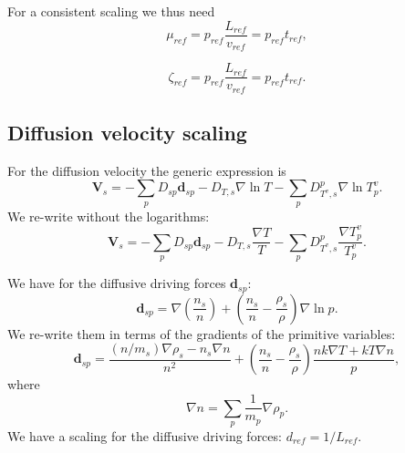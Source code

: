 \documentclass[a4paper,11pt,english]{article}
\begin{document}
For a consistent scaling we thus need
\begin{equation}
     \mu_{ref} = p_{ref} \frac{L_{ref}}{v_{ref}} = p_{ref} t_{ref},
\end{equation}

\begin{equation}
     \zeta_{ref} = p_{ref} \frac{L_{ref}}{v_{ref}} = p_{ref} t_{ref}.
\end{equation}

\subsection{Diffusion velocity scaling}
For the diffusion velocity the generic expression is
\begin{equation}
     \mathbf{V}_s = -\sum_{p} D_{sp}\mathbf{d}_{sp} - D_{T,s} \nabla \ln T - \sum_{p} D^{p}_{T^v,s} \nabla \ln T^v_p.
\end{equation}
We re-write without the logarithms:
\begin{equation}
     \mathbf{V}_s = -\sum_{p} D_{sp}\mathbf{d}_{sp} - D_{T,s} \frac{\nabla T}{T} - \sum_{p} D^{p}_{T^v,s} \frac{\nabla T^v_p}{T^v_p}.
\end{equation}

We have for the diffusive driving forces $\mathbf{d}_{sp}$:
\begin{equation}
     \mathbf{d}_{sp} = \nabla \left(\frac{n_s}{n}\right) +  \left(\frac{n_s}{n} - \frac{\rho_s}{\rho}\right) \nabla \ln p.
\end{equation}
We re-write them in terms of the gradients of the primitive variables:
\begin{equation}
     \mathbf{d}_{sp} = \frac{(n / m_s) \nabla \rho_s - n_s \nabla n}{n^2} + \left(\frac{n_s}{n} - \frac{\rho_s}{\rho}\right) \frac{nk \nabla T + kT \nabla n}{p},
\end{equation}
where
\begin{equation}
     \nabla n = \sum_p \frac{1}{m_p} \nabla \rho_p.
\end{equation}
We have a scaling for the diffusive driving forces: $d_{ref} = 1 / L_{ref}$.
\end{document}
